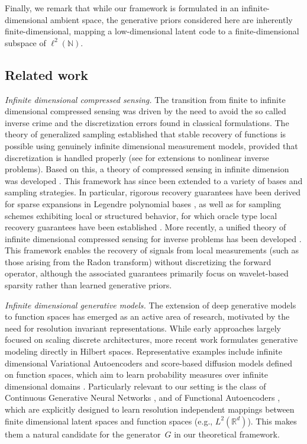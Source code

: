 \documentclass[a4paper,oneside]{amsart}
\begin{document}
Finally, we remark that while our framework is formulated in an infinite-dimensional ambient space, the generative priors considered here are inherently finite-dimensional, mapping a low-dimensional latent code to a finite-dimensional subspace of $\ell^2(\mathbb{N})$.


\subsection{Related work}



\textit{Infinite dimensional compressed sensing.}
The transition from finite to infinite dimensional compressed sensing was driven by the need to avoid the so called inverse crime and the discretization errors found in classical formulations. The theory of generalized sampling established that stable recovery of functions is possible using genuinely infinite dimensional measurement models, provided that discretization is handled properly \cite{adcock2012generalized} (see \cite{alberti2022infinite} for extensions to nonlinear inverse problems). Based on this, a theory of compressed sensing in infinite dimension was developed \cite{adcock2016generalized,adcock2017breaking,adcock2018infinite,adcock2022sparse,adcock_efficient_2024}. This framework has since been extended to a variety of bases and sampling strategies. In particular, rigorous recovery guarantees have been derived for sparse expansions in Legendre polynomial bases \cite{rauhut2012sparse}, as well as for sampling schemes exhibiting local or structured behavior, for which oracle type local recovery guarantees have been established \cite{adcock2020oracle}. More recently, a unified theory of infinite dimensional compressed sensing for inverse problems has been developed \cite{alberti2023compressed,alberti2025compressed}. This framework enables the recovery of signals from local measurements (such as those arising from the Radon transform) without discretizing the forward operator, although the associated guarantees primarily focus on wavelet-based sparsity rather than learned generative priors.

\textit{Infinite dimensional generative models.}
The extension of deep generative models to function spaces has emerged as an active area of research, motivated by the need for resolution invariant representations. While early approaches largely focused on scaling discrete architectures, more recent work formulates generative modeling directly in Hilbert spaces. Representative examples include infinite dimensional Variational Autoencoders and score-based diffusion models defined on function spaces, which aim to learn probability measures over infinite dimensional domains \cite{franzese2025generative, bond-taylor2024inftydiff}. Particularly relevant to our setting is the class of Continuous Generative Neural Networks \cite{alberti2022continuous}, and of Functional Autoencoders \cite{bunker2025autoencoders}, which are explicitly designed to learn resolution independent mappings between finite dimensional latent spaces and function spaces (e.g., $L^2(\mathbb{R}^d)$). This makes them a natural candidate for the generator~$G$ in our theoretical framework.
\end{document}
